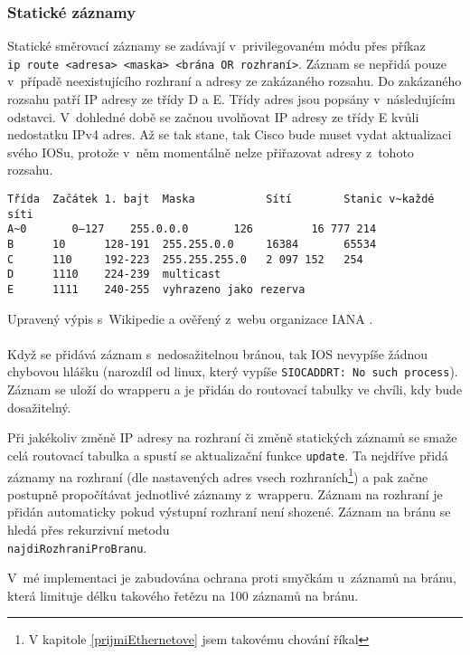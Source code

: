 \subsubsection{Statické záznamy}
Statické směrovací záznamy se zadávají v~privilegovaném módu přes příkaz \\\verb|ip route <adresa> <maska> <brána OR rozhraní>|. Záznam se nepřidá pouze v~případě neexistujícího rozhraní a adresy ze zakázaného rozsahu. Do zakázaného rozsahu patří IP adresy ze třídy D a E. Třídy adres jsou popsány v~následujícím odstavci. V~dohledné době se začnou uvolňovat IP adresy ze třídy E kvůli nedostatku IPv4 adres. Až se tak stane, tak Cisco bude muset vydat aktualizaci svého IOSu, protože v~něm momentálně nelze přiřazovat adresy z~tohoto rozsahu.
\begin{verbatim}
Třída  Začátek 1. bajt  Maska           Sítí        Stanic v~každé síti
A~0       0–127    255.0.0.0       126         16 777 214
B      10      128-191  255.255.0.0     16384       65534
C      110     192-223  255.255.255.0   2 097 152   254
D      1110    224-239  multicast
E      1111    240-255  vyhrazeno jako rezerva
\end{verbatim}
Upravený výpis s~Wikipedie \cite{wiki:ip} a ověřený z~webu organizace IANA \cite{iana}.

\paragraph{}
Když se přidává záznam s~nedosažitelnou bránou, tak IOS nevypíše žádnou chybovou hlášku (narozdíl od linux, který vypíše \verb|SIOCADDRT: No such process|). Záznam se uloží do wrapperu a je přidán do routovací tabulky ve chvíli, kdy bude dosažitelný. 

Při jakékoliv změně IP adresy na rozhraní či změně statických záznamů se smaže celá routovací tabulka a spustí se aktualizační funkce \verb|update|. Ta nejdříve přidá záznamy na rozhraní (dle nastavených adres vsech rozhraních\footnote{V kapitole \ref{prijmiEthernetove} jsem takovému chování říkal }) a pak začne postupně propočítávat jednotlivé záznamy z~wrapperu. Záznam na rozhraní je přidán automaticky pokud výstupní rozhraní není shozené. Záznam na bránu se hledá přes rekurzivní metodu \\\verb|najdiRozhraniProBranu|.

V~mé implementaci je zabudována ochrana proti smyčkám u~záznamů na bránu, která limituje délku takového řetězu na 100 záznamů na bránu.

